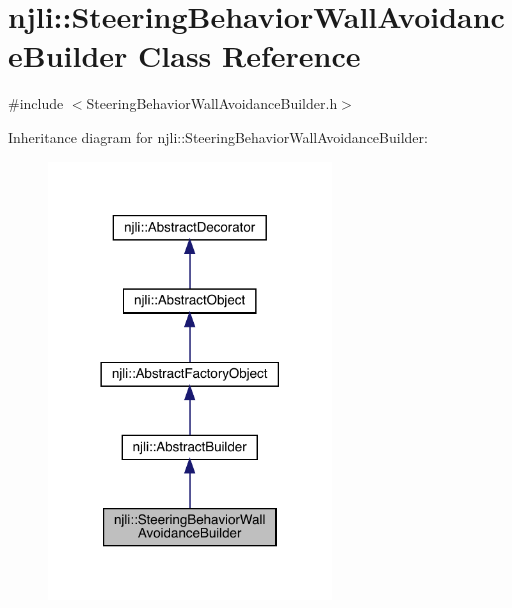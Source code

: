 \hypertarget{classnjli_1_1_steering_behavior_wall_avoidance_builder}{}\section{njli\+:\+:Steering\+Behavior\+Wall\+Avoidance\+Builder Class Reference}
\label{classnjli_1_1_steering_behavior_wall_avoidance_builder}


{\ttfamily \#include $<$Steering\+Behavior\+Wall\+Avoidance\+Builder.\+h$>$}



Inheritance diagram for njli\+:\+:Steering\+Behavior\+Wall\+Avoidance\+Builder\+:\nopagebreak
\begin{figure}[H]
\begin{center}
\leavevmode
\includegraphics[width=213pt]{classnjli_1_1_steering_behavior_wall_avoidance_builder__inherit__graph}
\end{center}
\end{figure}


